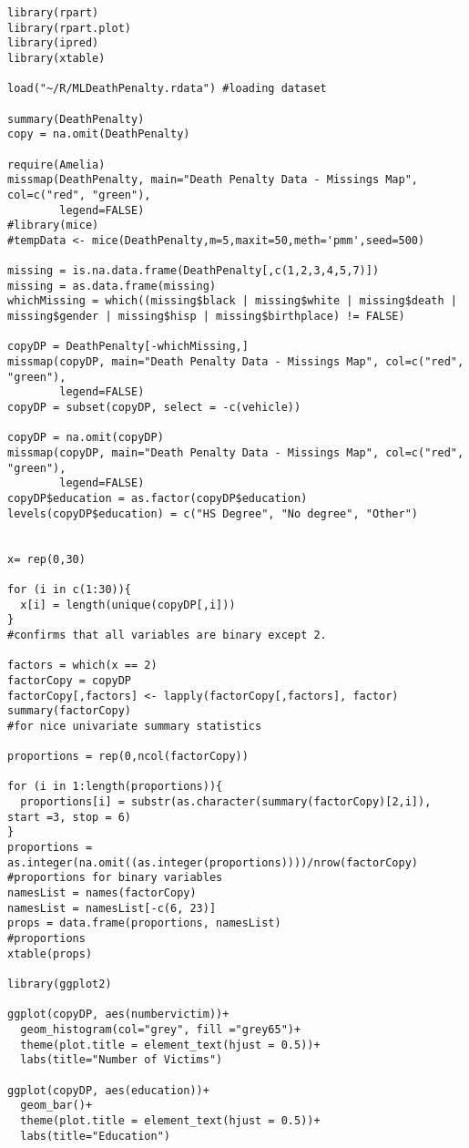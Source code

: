 \documentclass{article}
\begin{document}
\begin{verbatim}
library(rpart)
library(rpart.plot)
library(ipred)
library(xtable)

load("~/R/MLDeathPenalty.rdata") #loading dataset

summary(DeathPenalty)
copy = na.omit(DeathPenalty)

require(Amelia)
missmap(DeathPenalty, main="Death Penalty Data - Missings Map", col=c("red", "green"),
        legend=FALSE)
#library(mice)
#tempData <- mice(DeathPenalty,m=5,maxit=50,meth='pmm',seed=500)

missing = is.na.data.frame(DeathPenalty[,c(1,2,3,4,5,7)])
missing = as.data.frame(missing)
whichMissing = which((missing$black | missing$white | missing$death | missing$gender | missing$hisp | missing$birthplace) != FALSE)

copyDP = DeathPenalty[-whichMissing,]
missmap(copyDP, main="Death Penalty Data - Missings Map", col=c("red", "green"),
        legend=FALSE)
copyDP = subset(copyDP, select = -c(vehicle))

copyDP = na.omit(copyDP)
missmap(copyDP, main="Death Penalty Data - Missings Map", col=c("red", "green"),
        legend=FALSE)
copyDP$education = as.factor(copyDP$education)
levels(copyDP$education) = c("HS Degree", "No degree", "Other")


x= rep(0,30)

for (i in c(1:30)){
  x[i] = length(unique(copyDP[,i]))
}
#confirms that all variables are binary except 2. 

factors = which(x == 2)
factorCopy = copyDP
factorCopy[,factors] <- lapply(factorCopy[,factors], factor)
summary(factorCopy)
#for nice univariate summary statistics

proportions = rep(0,ncol(factorCopy))

for (i in 1:length(proportions)){
  proportions[i] = substr(as.character(summary(factorCopy)[2,i]), start =3, stop = 6)
}
proportions = as.integer(na.omit((as.integer(proportions))))/nrow(factorCopy)
#proportions for binary variables
namesList = names(factorCopy)
namesList = namesList[-c(6, 23)]
props = data.frame(proportions, namesList)
#proportions
xtable(props)

library(ggplot2)

ggplot(copyDP, aes(numbervictim))+
  geom_histogram(col="grey", fill ="grey65")+
  theme(plot.title = element_text(hjust = 0.5))+
  labs(title="Number of Victims")

ggplot(copyDP, aes(education))+
  geom_bar()+
  theme(plot.title = element_text(hjust = 0.5))+
  labs(title="Education")



\end{verbatim}
\end{document}
